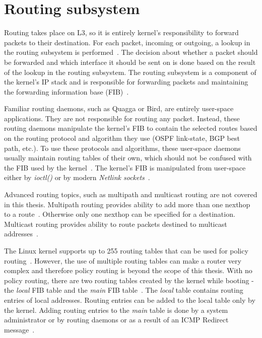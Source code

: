 
\section{Routing subsystem}\label{sec:linux-routing}
Routing takes place on L3, so it is entirely kernel's responsibility to forward packets to their destination.
For each packet, incoming or outgoing, a lookup in the routing subsystem is performed~\cite{linux-kernel-networking}.
The decision about whether a packet should be forwarded and which interface it should be sent on is done based on the result of
the lookup in the routing subsystem.
The routing subsystem is a component of the kernel's IP stack and is responsible for forwarding packets and maintaining
the forwarding information base (FIB)~\cite{linux-kernel-networking}.

Familiar routing daemons, such as Quagga or Bird, are entirely user-space applications.
They are not responsible for routing any packet.
Instead, these routing daemons manipulate the kernel's FIB to
contain the selected routes based on
the routing protocol and algorithm they use (OSPF link-state, BGP best path, etc.).
To use these protocols and algorithms,
these user-space daemons usually maintain routing tables of their own, which should not be confused with the
FIB used by the kernel~\cite{linux-kernel-networking}.
The kernel's FIB is manipulated from user-space
either by {\it{ioctl()}} or by modern {\it{Netlink sockets}}~\cite{networking-subsystem-configuration-interface}.

Advanced routing topics, such as multipath and multicast routing are not covered in this thesis.
Multipath routing provides ability to add more than one nexthop to a route~\cite{linux-kernel-networking}.
Otherwise only one nexthop can be specified for a destination.
Multicast routing provides ability to route packets destined to multicast addresses~\cite{linux-kernel-networking}.

The Linux kernel supports up to 255 routing tables that can be used for policy routing~\cite{linux-kernel-networking}.
However, the use of multiple routing tables can make a router very complex and therefore
policy routing is beyond the scope of this thesis.
With no policy routing, there are two routing tables created by the kernel while booting - the {\it{local}} FIB table
and the {\it{main}} FIB table~\cite{linux-kernel-networking}.
The {\it{local}} table contains routing entries of local addresses.
Routing entries can be added to the local table only by the kernel.
Adding routing entries to the {\it{main}} table is done by a system
administrator or by routing daemons or as a result of an ICMP Redirect message~\cite{linux-kernel-networking}.

